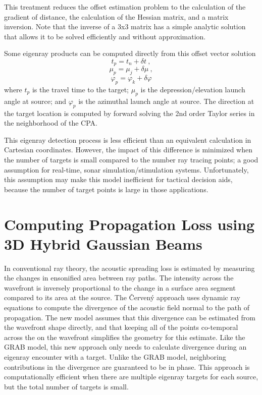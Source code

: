 \documentclass{ws-jca}
\newcommand{\threeD}{3\nobreakdash\textendash D }	%
\newcommand{\Cerveny}{\v{C}erven\'{y} }
\begin{document}
This treatment reduces the offset estimation problem to the calculation of
the gradient of distance, the calculation of the Hessian matrix, and a
matrix inversion. Note that the inverse of a 3x3 matrix has a simple
analytic solution that allows it to be solved efficiently and without
approximation.

Some eigenray products can be computed directly from this offset vector
solution
\begin{equation}
	t_p = t_n + \delta t \:,
	\label{eq:delta_t}
\end{equation}
\begin{equation}
	\mu_p = \mu_j + \delta \mu \:,
	\label{eq:delta_mu}
\end{equation}
\begin{equation}
	\varphi_p = \varphi_k + \delta \varphi
	\label{eq:delta_varphi}
\end{equation}
where 
\(t_p\) is the travel time to the target;
\(\mu_p\) is the depression/elevation launch angle at source; and
\(\varphi_p\) is the azimuthal launch angle at source.
The direction at the target location is computed by forward solving the 2nd
order Taylor series in the neighborhood of the CPA.

This eigenray detection process is less efficient than an equivalent
calculation in Cartesian coordinates. However, the impact of this
difference is minimized when the number of targets is small compared to the
number ray tracing points; a good assumption for real-time, sonar
simulation/stimulation systems. Unfortunately, this assumption may make this model
inefficient for tactical decision aids, because the number of target points
is large in those applications.

\section{Computing Propagation Loss using \threeD Hybrid Gaussian Beams}

In conventional ray theory, the acoustic spreading loss is estimated by
measuring the changes in ensonified area between ray paths. The intensity
across the wavefront is inversely proportional to the change in a surface
area segment compared to its area at the source. The \Cerveny approach uses
dynamic ray equations to compute the divergence of the acoustic field
normal to the path of propagation. 
The new model assumes that this divergence can be estimated from the wavefront
shape directly, and that keeping all of the points co-temporal across the
on the wavefront simplifies the geometry for this estimate.
Like the GRAB model, this new approach only needs
to calculate divergence during an eigenray encounter with a target. Unlike
the GRAB model, neighboring contributions in the divergence are guaranteed
to be in phase. This approach is computationally efficient when there are
multiple eigenray targets for each source, but the total number of targets
is small.
\end{document}

